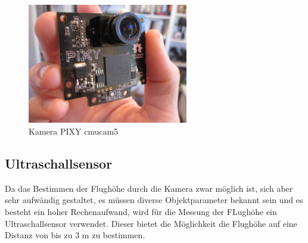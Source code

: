 \begin{figure}[tbh]
\begin{centering}
\includegraphics[width = 70mm]{Bilder/PIXY}
\par\end{centering}
\caption{Kamera PIXY cmucam5}
\label{PIXY}
\end{figure}

\subsection{Ultraschallsensor}
Da das Bestimmen der Flughöhe durch die Kamera zwar möglich ist, sich aber sehr aufwändig gestaltet, es müssen diverse Objektparameter bekannt sein und es besteht ein hoher Rechenaufwand, wird für die Messung der FLughöhe ein Ultraschallsensor verwendet. Dieser bietet die Möglichkeit die Flughöhe auf eine Distanz von bis zu 3 m zu bestimmen.